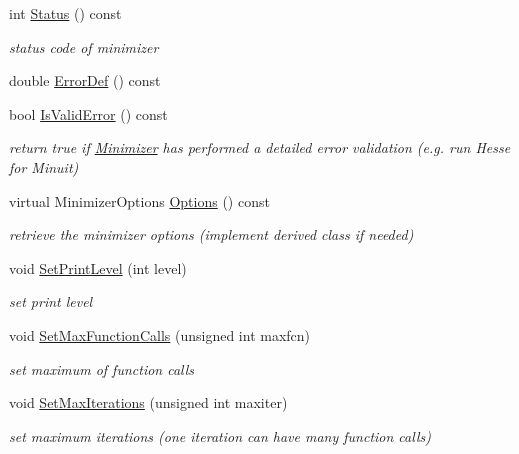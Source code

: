 \begin{DoxyCompactItemize}
int \mbox{\hyperlink{classROOT_1_1Math_1_1Minimizer_a634833b3a6e525ef10605de5fd051499}{Status}} () const
\begin{DoxyCompactList}\small\item\em status code of minimizer \end{DoxyCompactList}\item 
double \mbox{\hyperlink{classROOT_1_1Math_1_1Minimizer_aa4e46f31bb8dfb770fcb704e585a3593}{Error\+Def}} () const
\item 
bool \mbox{\hyperlink{classROOT_1_1Math_1_1Minimizer_aac4dfcda9c3eb7e672d450c0e78c61bf}{Is\+Valid\+Error}} () const
\begin{DoxyCompactList}\small\item\em return true if \mbox{\hyperlink{classROOT_1_1Math_1_1Minimizer}{Minimizer}} has performed a detailed error validation (e.\+g. run Hesse for Minuit) \end{DoxyCompactList}\item 
virtual Minimizer\+Options \mbox{\hyperlink{classROOT_1_1Math_1_1Minimizer_a9b0653bcf3d2c0b4df79c1db2068ff27}{Options}} () const
\begin{DoxyCompactList}\small\item\em retrieve the minimizer options (implement derived class if needed) \end{DoxyCompactList}\item 
void \mbox{\hyperlink{classROOT_1_1Math_1_1Minimizer_a726ee3c159360784a2d76f0b9e9594a6}{Set\+Print\+Level}} (int level)
\begin{DoxyCompactList}\small\item\em set print level \end{DoxyCompactList}\item 
void \mbox{\hyperlink{classROOT_1_1Math_1_1Minimizer_aabbadaa76bb5723fcaec0eb7d40850b2}{Set\+Max\+Function\+Calls}} (unsigned int maxfcn)
\begin{DoxyCompactList}\small\item\em set maximum of function calls \end{DoxyCompactList}\item 
void \mbox{\hyperlink{classROOT_1_1Math_1_1Minimizer_a1aa272e578cdf2af1b80cc641ce6c58c}{Set\+Max\+Iterations}} (unsigned int maxiter)
\begin{DoxyCompactList}\small\item\em set maximum iterations (one iteration can have many function calls) \end{DoxyCompactList}\item 

\end{DoxyCompactItemize}
